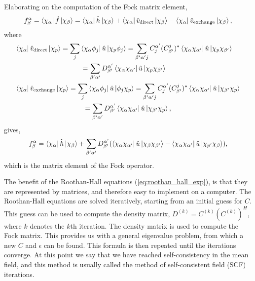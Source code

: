 Elaborating on the computation of the Fock matrix element,
\begin{equation}
    f^\alpha_\beta = \bra{\chi_\alpha} \hat{f} \ket{\chi_\beta}
        = \bra{\chi_\alpha} \hat{h} \ket{\chi_\beta} 
        + \bra{\chi_\alpha} \hat{v}_{\text{direct}} \ket{\chi_\beta}
        - \bra{\chi_\alpha} \hat{v}_{\text{exchange}} \ket{\chi_\beta},
\end{equation}
where
\begin{align}
    &\begin{gathered}
    \bra{\chi_\alpha} \hat{v}_{\text{direct}} \ket{\chi_p}
        = \sum_j \bra{\chi_\alpha \phi_j} \hat{u} \ket{\chi_p \phi_j} 
        = \sum_{\beta'\alpha'j} C^{\alpha'}_j (C^j_{\beta'})^*
            \bra{\chi_\alpha \chi_{\alpha'}} \hat{u} \ket{\chi_p \chi_{\beta'}} \\
        = \sum_{\beta'\alpha'} D^{\alpha'}_{\beta'} \bra{\chi_\alpha \chi_{\alpha'}} \hat{u} \ket{\chi_p \chi_{\beta'}}
    \end{gathered} \\
    &\begin{gathered}
    \bra{\chi_\alpha} \hat{v}_{\text{exchange}} \ket{\chi_p}
        = \sum_j \bra{\chi_\alpha \phi_j} \hat{u} \ket{\phi_j \chi_p} 
        = \sum_{\beta'\alpha'j} C^{\alpha'}_j (C^j_{\beta'})^* 
            \bra{\chi_\alpha \chi_{\alpha'}} \hat{u} \ket{\chi_{\beta'} \chi_p} \\
        = \sum_{\beta'\alpha'} D^{\alpha'}_{\beta'} \bra{\chi_\alpha \chi_{\alpha'}} \hat{u} \ket{\chi_{\beta'} \chi_p},  
    \end{gathered}
\end{align}
gives,
\begin{equation}
    f^\alpha_\beta = \bra{\chi_\alpha}\hat{h} \ket{\chi_\beta} 
        + \sum_{\beta'\alpha'}D^{\alpha'}_{\beta'}(
            \bra{\chi_\alpha\chi_{\alpha'}}\hat{u} \ket{\chi_\beta\chi_{\beta'}}
            - \bra{\chi_\alpha\chi_{\alpha'}}\hat{u} \ket{\chi_{p'}\chi_\beta}
        ),
\end{equation}
which is the matrix element of the Fock operator.

The benefit of the Roothan-Hall equations (\autoref{eq:roothan_hall_exp}), is that they 
are represented by matrices, and therefore easy to implement on a computer. The
Roothan-Hall equations are solved iteratively, starting from an initial guess for $C$. 
This guess can be used to compute the density matrix, 
$D^{(k)} = C^{(k)}(C^{(k)})^H$, where $k$ denotes the $k$th iteration. The density 
matrix is used to compute the Fock matrix. This provides us with a general eigenvalue 
problem, from which a new $C$ and $\epsilon$ can be found. This formula is then repeated
until the iterations converge. At this point we say that we have reached self-consistency 
in the mean field, and this method is usually called the method of self-consistent
field (SCF) iterations.

